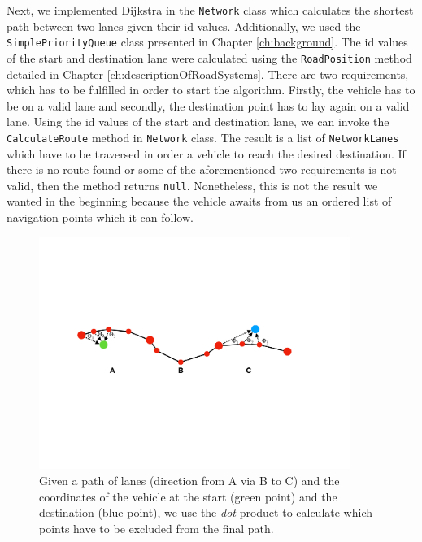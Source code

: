 Next, we implemented Dijkstra in the \texttt{Network} class which calculates the shortest path between two lanes given their id values. Additionally, we used the \texttt{SimplePriorityQueue} class presented in Chapter \ref{ch:background}. The id values of the start and destination lane were calculated using the \texttt{RoadPosition} method detailed in Chapter \ref{ch:descriptionOfRoadSystems}. There are two requirements, which has to be fulfilled in order to start the algorithm. Firstly, the vehicle has to be on a valid lane and secondly, the destination point has to lay again on a valid lane. Using the id values of the start and destination lane, we can invoke the \texttt{CalculateRoute} method in \texttt{Network} class. The result is a list of \texttt{NetworkLanes} which have to be traversed in order a vehicle to reach the desired destination. If there is no route found or some of the aforementioned two requirements is not valid, then the method returns \texttt{null}. Nonetheless, this is not the result we wanted in the beginning because the vehicle awaits from us an ordered list of navigation points which it can follow.\\

\begin{figure}[htb]
	\centering
	\includegraphics[width=0.9\textwidth]{figures/navpoints}
	\caption{Given a path of lanes (direction from A via B to C) and the coordinates of the vehicle at the start (green point) and the destination (blue point), we use the \emph{dot} product to calculate which points have to be excluded from the final path.}
	\label{fig:navpoints}
\end{figure}

